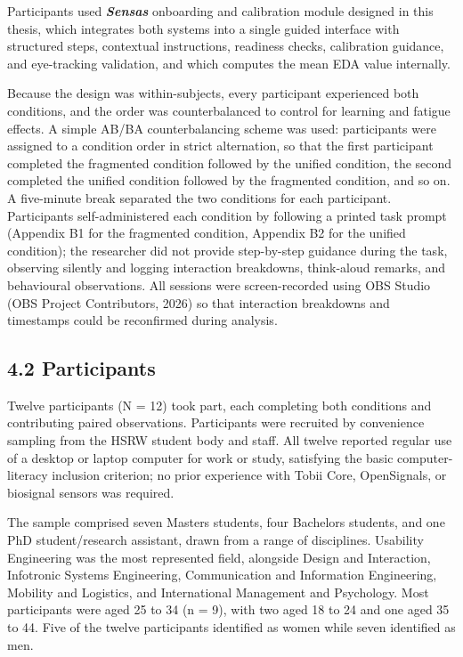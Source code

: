 \documentclass[
]{article}
\begin{document}
Participants used \emph{\textbf{Sensa\textquotesingle s}} onboarding and calibration module designed in this thesis, which integrates both systems into a single guided interface with structured steps, contextual instructions, readiness checks, calibration guidance, and eye-tracking validation, and which computes the mean EDA value internally.

Because the design was within-subjects, every participant experienced both conditions, and the order was counterbalanced to control for learning and fatigue effects. A simple AB/BA counterbalancing scheme was used: participants were assigned to a condition order in strict alternation, so that the first participant completed the fragmented condition followed by the unified condition, the second completed the unified condition followed by the fragmented condition, and so on. A five-minute break separated the two conditions for each participant. Participants self-administered each condition by following a printed task prompt (Appendix B1 for the fragmented condition, Appendix B2 for the unified condition); the researcher did not provide step-by-step guidance during the task, observing silently and logging interaction breakdowns, think-aloud remarks, and behavioural observations. All sessions were screen-recorded using OBS Studio (OBS Project Contributors, 2026) so that interaction breakdowns and timestamps could be reconfirmed during analysis.

\hypertarget{participants}{%
\subsection{4.2 Participants}\label{participants}}

Twelve participants (N = 12) took part, each completing both conditions and contributing paired observations. Participants were recruited by convenience sampling from the HSRW student body and staff. All twelve reported regular use of a desktop or laptop computer for work or study, satisfying the basic computer-literacy inclusion criterion; no prior experience with Tobii Core, OpenSignals, or biosignal sensors was required.

The sample comprised seven Master\textquotesingle s students, four Bachelor\textquotesingle s students, and one PhD student/research assistant, drawn from a range of disciplines. Usability Engineering was the most represented field, alongside Design and Interaction, Infotronic Systems Engineering, Communication and Information Engineering, Mobility and Logistics, and International Management and Psychology. Most participants were aged 25 to 34 (n = 9), with two aged 18 to 24 and one aged 35 to 44. Five of the twelve participants identified as women while seven identified as men.
\end{document}
